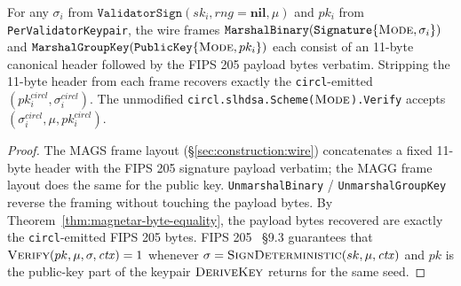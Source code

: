 \begin{corollary}
\label{cor:wire-byte-identity}
For any $\sigma_i$ from
$\texttt{ValidatorSign}(sk_i, \textit{rng}=\textbf{nil}, \mu)$ and
$pk_i$ from \texttt{PerValidatorKeypair}, the wire frames
$\texttt{MarshalBinary}(\texttt{Signature}\{\textsc{Mode}, \sigma_i\})$
and $\texttt{MarshalGroupKey}(\texttt{PublicKey}\{\textsc{Mode},
pk_i\})$ each consist of an 11-byte canonical header followed
by the FIPS 205 payload bytes verbatim. Stripping the 11-byte
header from each frame recovers exactly the
\texttt{circl}-emitted $(pk_i^{\textit{circl}},
\sigma_i^{\textit{circl}})$. The unmodified
\texttt{circl.slhdsa.Scheme($\textsc{Mode}$).Verify} accepts
$(\sigma_i^{\textit{circl}}, \mu, pk_i^{\textit{circl}})$.
\end{corollary}

\begin{proof}
The MAGS frame layout (\S\ref{sec:construction:wire})
concatenates a fixed 11-byte header with the FIPS 205 signature
payload verbatim; the MAGG frame layout does the same for the
public key. \texttt{UnmarshalBinary} / \texttt{UnmarshalGroupKey}
reverse the framing without touching the payload bytes. By
Theorem~\ref{thm:magnetar-byte-equality}, the payload bytes
recovered are exactly the \texttt{circl}-emitted FIPS 205 bytes.
FIPS 205 \cite{fips205}~\S9.3 guarantees that
$\textsc{Verify}(pk, \mu, \sigma, \mathit{ctx}) = 1$ whenever
$\sigma = \textsc{SignDeterministic}(sk, \mu, \mathit{ctx})$ and
$pk$ is the public-key part of the keypair $\textsc{DeriveKey}$
returns for the same seed.
\end{proof}

